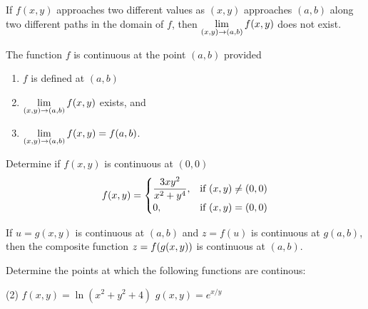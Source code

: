 \documentclass[../mathNotesPreamble]{subfiles}
\begin{document}
  \begin{thmBox*}
    If $f(x,y)$ approaches two different values as $(x,y)$ approaches $(a,b)$ along two different paths in the domain of $f$, then $\displaystyle\lim_{(x,y)\to (a,b)} f(x,y)$ does not exist.
  \end{thmBox*}
  \pagebreak

  \begin{defn*}[Continuity]
    The function $f$ is continuous at the point $(a,b)$ provided
    \begin{enumerate}
      \item $f$ is defined at $(a,b)$
      \item $\displaystyle\lim_{(x,y)\to (a,b)} f(x,y)$ exists, and 
      \item $\displaystyle\lim_{(x,y)\to (a,b)} f(x,y) = f(a,b)$.
    \end{enumerate}
  \end{defn*}

  \begin{ex*}
    Determine if $f(x,y)$ is continuous at $(0,0)$
      \[f(x,y)=\begin{cases}
        \displaystyle\frac{3xy^2}{x^2+y^4}, &\textnormal{if } (x,y)\neq (0,0)\\
        0, &\textnormal{if } (x,y)=(0,0)
      \end{cases}\]
  \end{ex*}

  \begin{thmBox*}
    If $u=g(x,y)$ is continuous at $(a,b)$ and $z=f(u)$ is continuous at $g(a,b)$, then the composite function $z=f{\left(g(x,y)\right)}$ is continuous at $(a,b)$.
  \end{thmBox*}

  \begin{ex*}
    Determine the points at which the following functions are continous:
  \end{ex*}
  \begin{tasks}[after-item-skip=\stretch{1}, label=](2)
    \task $f(x,y)=\ln(x^2+y^2+4)$
    \task $g(x,y)=e^{x/y}$
  \end{tasks}
  \pagebreak
\end{document}
